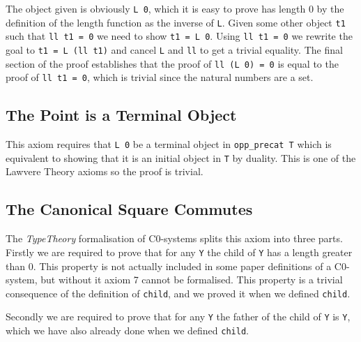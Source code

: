 The object given is obviously \lstinline|L 0|, which it is easy to prove has
length 0 by the definition of the length function as the inverse of
\lstinline|L|. Given some other object \lstinline|t1| such that 
\lstinline|ll t1 = 0| we need to show \lstinline|t1 = L 0|. Using 
\lstinline|ll t1 = 0| we rewrite the goal to \lstinline|t1 = L (ll t1)| and
cancel \lstinline|L| and \lstinline|ll| to get a trivial equality. The final
section of the proof establishes that the proof of \lstinline|ll (L 0) = 0| is
equal to the proof of \lstinline|ll t1 = 0|, which is trivial since the
natural numbers are a set.

\subsection{The Point is a Terminal Object}
This axiom requires that \lstinline|L 0| be a terminal object in 
\lstinline|opp_precat T| which is equivalent to showing that it is an initial
object in \lstinline|T| by duality. This is one of the Lawvere Theory axioms so
the proof is trivial.

\subsection{The Canonical Square Commutes}
The \textit{TypeTheory} formalisation of C0-systems splits this axiom into three
parts. Firstly we are required to prove that for any \lstinline|Y| the child of
\lstinline|Y| has a length greater than 0. This property is not actually
included in some paper definitions of a C0-system, but without it axiom 7 cannot
be formalised. This property is a trivial consequence of the definition of
\lstinline|child|, and we proved it when we defined \lstinline|child|.

Secondly we are required to prove that for any \lstinline|Y| the father of the
child of \lstinline|Y| is \lstinline|Y|, which we have also already done when we
defined \lstinline|child|.

